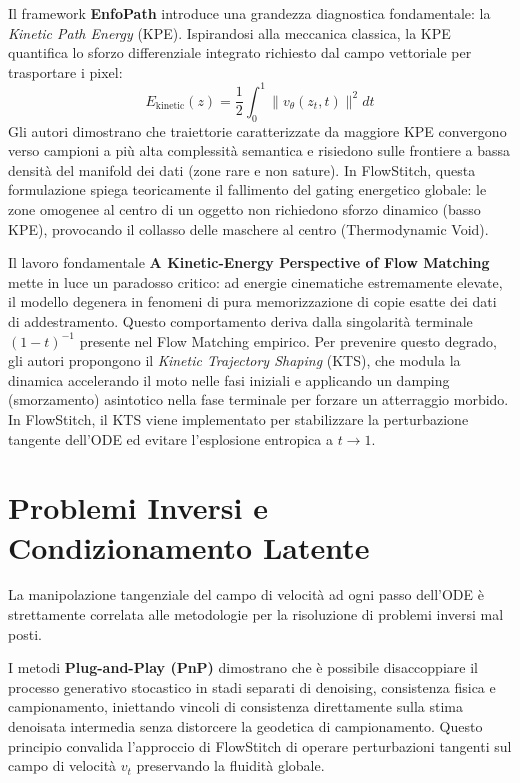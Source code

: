 \documentclass[12pt,a4paper]{report}
\begin{document}
Il framework \textbf{EnfoPath} \cite{enfopath2025} introduce una grandezza diagnostica fondamentale: la \textit{Kinetic Path Energy} (KPE). Ispirandosi alla meccanica classica, la KPE quantifica lo sforzo differenziale integrato richiesto dal campo vettoriale per trasportare i pixel:
\begin{equation}
    E_{\text{kinetic}}(z) = \frac{1}{2} \int_0^1 \|v_\theta(z_t, t)\|^2 dt
\end{equation}
Gli autori dimostrano che traiettorie caratterizzate da maggiore KPE convergono verso campioni a più alta complessità semantica e risiedono sulle frontiere a bassa densità del manifold dei dati (zone rare e non sature). 
In FlowStitch, questa formulazione spiega teoricamente il fallimento del gating energetico globale: le zone omogenee al centro di un oggetto non richiedono sforzo dinamico (basso KPE), provocando il collasso delle maschere al centro (Thermodynamic Void).

Il lavoro fondamentale \textbf{A Kinetic-Energy Perspective of Flow Matching} \cite{kinetic2026} mette in luce un paradosso critico: ad energie cinematiche estremamente elevate, il modello degenera in fenomeni di pura memorizzazione di copie esatte dei dati di addestramento. Questo comportamento deriva dalla singolarità terminale $(1-t)^{-1}$ presente nel Flow Matching empirico. Per prevenire questo degrado, gli autori propongono il \textit{Kinetic Trajectory Shaping} (KTS), che modula la dinamica accelerando il moto nelle fasi iniziali e applicando un damping (smorzamento) asintotico nella fase terminale per forzare un atterraggio morbido. In FlowStitch, il KTS viene implementato per stabilizzare la perturbazione tangente dell'ODE ed evitare l'esplosione entropica a $t \to 1$.

\section{Problemi Inversi e Condizionamento Latente}
La manipolazione tangenziale del campo di velocità ad ogni passo dell'ODE è strettamente correlata alle metodologie per la risoluzione di problemi inversi mal posti.

I metodi \textbf{Plug-and-Play (PnP)} \cite{pnp2025} dimostrano che è possibile disaccoppiare il processo generativo stocastico in stadi separati di denoising, consistenza fisica e campionamento, iniettando vincoli di consistenza direttamente sulla stima denoisata intermedia senza distorcere la geodetica di campionamento. Questo principio convalida l'approccio di FlowStitch di operare perturbazioni tangenti sul campo di velocità $v_t$ preservando la fluidità globale.
\end{document}
